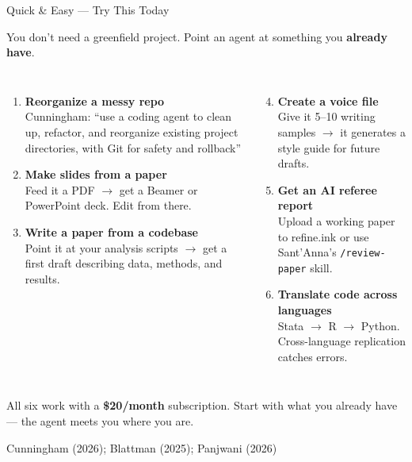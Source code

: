 \documentclass[aspectratio=169, 11pt]{beamer}
\newcommand{\emphgold}[1]{\alert{\textbf{#1}}}
\newcommand{\sourceref}[1]{\vspace{0.15cm}\hfill{\tiny\textcolor{medgray}{#1}}}
\begin{document}
\begin{frame}[shrink=24]{Quick \& Easy --- Try This Today}
\begin{keyinsight}
You don't need a greenfield project. Point an agent at something you \emphgold{already have}.
\end{keyinsight}
\vspace{0.1cm}
\begin{columns}[T]
\begin{enumerate}
  \item \textbf{Reorganize a messy repo}\\
    \textcolor{medgray}{\tiny Cunningham: ``use a coding agent to clean up, refactor, and reorganize existing project directories, with Git for safety and rollback''}
  \item \textbf{Make slides from a paper}\\
    \textcolor{medgray}{\tiny Feed it a PDF $\rightarrow$ get a Beamer or PowerPoint deck. Edit from there.}
  \item \textbf{Write a paper from a codebase}\\
    \textcolor{medgray}{\tiny Point it at your analysis scripts $\rightarrow$ get a first draft describing data, methods, and results.}
\end{enumerate}

\begin{enumerate}
  \setcounter{enumi}{3}
  \item \textbf{Create a voice file}\\
    \textcolor{medgray}{\tiny Give it 5--10 writing samples $\rightarrow$ it generates a style guide for future drafts.}
  \item \textbf{Get an AI referee report}\\
    \textcolor{medgray}{\tiny Upload a working paper to refine.ink or use Sant'Anna's \texttt{/review-paper} skill.}
  \item \textbf{Translate code across languages}\\
    \textcolor{medgray}{\tiny Stata $\rightarrow$ R $\rightarrow$ Python. Cross-language replication catches errors.}
\end{enumerate}
\end{columns}
\vspace{0.15cm}
\begin{bigquote}
All six work with a \emphgold{\$20/month} subscription. Start with what you already have --- the agent meets you where you are.
\end{bigquote}
\sourceref{Cunningham (2026); Blattman (2025); Panjwani (2026)}
\end{frame}
\end{document}
